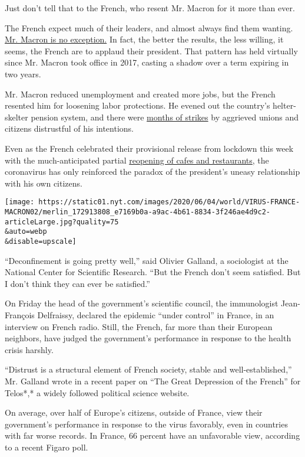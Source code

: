 Just don't tell that to the French, who resent Mr. Macron for it more
than ever.

The French expect much of their leaders, and almost always find them
wanting.
\href{https://www.nytimes.com/2020/02/25/world/europe/macron-france-pensions.html?searchResultPosition=13}{Mr.
Macron is no exception.} In fact, the better the results, the less
willing, it seems, the French are to applaud their president. That
pattern has held virtually since Mr. Macron took office in 2017, casting
a shadow over a term expiring in two years.

Mr. Macron reduced unemployment and created more jobs, but the French
resented him for loosening labor protections. He evened out the
country's helter-skelter pension system, and there were
\href{https://www.nytimes.com/2019/12/05/world/europe/france-strike-macron.html?searchResultPosition=33}{months
of strikes} by aggrieved unions and citizens distrustful of his
intentions.

Even as the French celebrated their provisional release from lockdown
this week with the much-anticipated partial
\href{https://www.nytimes.com/2020/06/02/world/europe/coronavirus-paris-cafe-reopen-france.html}{reopening
of cafes and restaurants}, the coronavirus has only reinforced the
paradox of the president's uneasy relationship with his own citizens.

\texttt{[image: https://static01.nyt.com/images/2020/06/04/world/VIRUS-FRANCE-MACRON02/merlin\_172913808\_e7169b0a-a9ac-4b61-8834-3f246ae4d9c2-articleLarge.jpg?quality=75\\\&auto=webp\\\&disable=upscale]}

``Deconfinement is going pretty well,'' said Olivier Galland, a
sociologist at the National Center for Scientific Research. ``But the
French don't seem satisfied. But I don't think they can ever be
satisfied.''

On Friday the head of the government's scientific council, the
immunologist Jean-François Delfraissy, declared the epidemic ``under
control'' in France, in an interview on French radio. Still, the French,
far more than their European neighbors, have judged the government's
performance in response to the health crisis harshly.

``Distrust is a structural element of French society, stable and
well-established,'' Mr. Galland wrote in a recent paper on ``The Great
Depression of the French'' for Telos*,* a widely followed political
science website.

On average, over half of Europe's citizens, outside of France, view
their government's performance in response to the virus favorably, even
in countries with far worse records. In France, 66 percent have an
unfavorable view, according to a recent Figaro poll.

